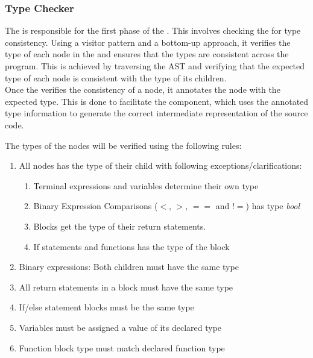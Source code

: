 \subsubsection{Type Checker}

The \typeChecker{} is responsible for the first phase of the \static. This involves
checking the \ast{} for type consistency. Using a visitor pattern and a bottom-up
approach, it verifies the type of each node in the \ast{} and ensures that the types
are consistent across the program. This is achieved by traversing the AST and
verifying that the expected type of each node is consistent with the type of its
children. \\

Once the \typeChecker{} verifies the consistency of a node, it annotates the node
with the expected type. This is done to facilitate the \codeGen{} component, which
uses the annotated type information to generate the correct intermediate
representation of the source code.


The types of the nodes will be verified using the following rules:
\begin{enumerate}

\item All nodes has the type of their child with following exceptions/clarifications:
\begin{enumerate}
\item Terminal expressions and variables determine their own type
\item Binary Expression Comparisons ($<$, $>$, $==$ and $!=$) has type \textit{bool}
\item Blocks get the type of their return statements. 
\item If statements and functions has the type of the block
\end{enumerate}
\item Binary expressions: Both children must have the same type
\item All return statements in a block must have the same type
\item If/else statement blocks must be the same type
\item Variables must be assigned a value of its declared type
\item Function block type must match declared function type
\end{enumerate}